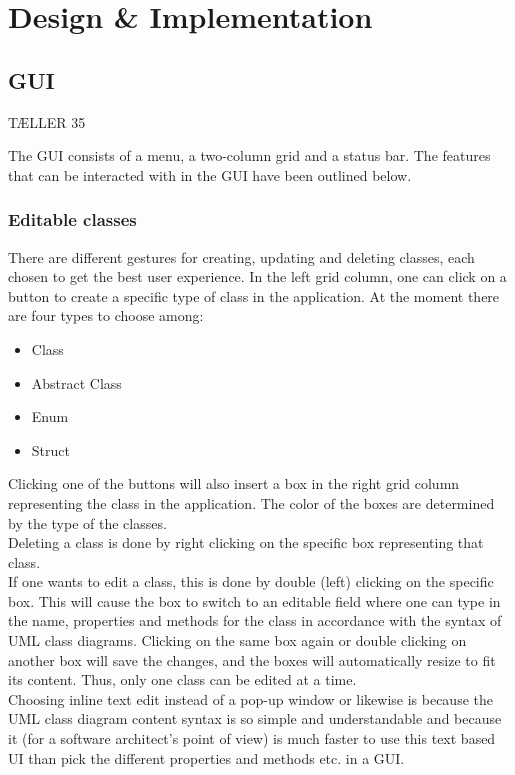 \chapter{Design \& Implementation}
\label{sec:design_and_implementation}

\section{GUI}
\label{sec:gui}
TÆLLER 35

The GUI consists of a menu, a two-column grid and a status bar. The features that can be interacted with in the GUI have been outlined below.

\subsection{Editable classes}

There are different gestures for creating, updating and deleting classes, each chosen to get the best user experience. In the left grid column, one can click on a button to create a specific type of class in the application. At the moment there are four types to choose among:

\begin{itemize}
  \item Class
  \item Abstract Class
  \item Enum
  \item Struct
\end{itemize}

Clicking one of the buttons will also insert a box in the right grid column representing the class in the application. The color of the boxes are determined by the type of the classes.\\

Deleting a class is done by right clicking on the specific box representing that class.\\

If one wants to edit a class, this is done by double (left) clicking on the specific box. This will cause the box to switch to an editable field where one can type in the name, properties and methods for the class in accordance with the syntax of UML class diagrams. Clicking on the same box again or double clicking on another box will save the changes, and the boxes will automatically resize to fit its content. Thus, only one class can be edited at a time.\\
Choosing inline text edit instead of a pop-up window or likewise is because the UML class diagram content syntax is so simple and understandable and because it (for a software architect's point of view) is much faster to use this text based UI than pick the different properties and methods etc. in a GUI.

